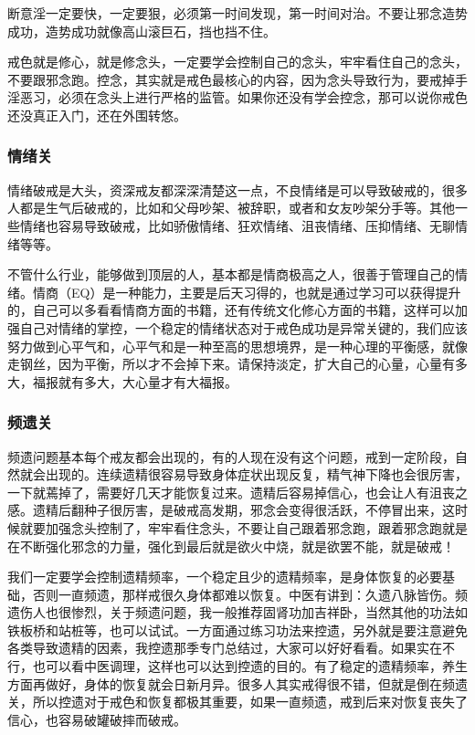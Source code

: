 断意淫一定要快，一定要狠，必须第一时间发现，第一时间对治。不要让邪念造势成功，造势成功就像高山滚巨石，挡也挡不住。

戒色就是修心，就是修念头，一定要学会控制自己的念头，牢牢看住自己的念头，不要跟邪念跑。控念，其实就是戒色最核心的内容，因为念头导致行为，要戒掉手淫恶习，必须在念头上进行严格的监管。如果你还没有学会控念，那可以说你戒色还没真正入门，还在外围转悠。

\subsubsection{情绪关}

情绪破戒是大头，资深戒友都深深清楚这一点，不良情绪是可以导致破戒的，很多人都是生气后破戒的，比如和父母吵架、被辞职，或者和女友吵架分手等。其他一些情绪也容易导致破戒，比如骄傲情绪、狂欢情绪、沮丧情绪、压抑情绪、无聊情绪等等。

不管什么行业，能够做到顶层的人，基本都是情商极高之人，很善于管理自己的情绪。情商（EQ）是一种能力，主要是后天习得的，也就是通过学习可以获得提升的，自己可以多看看情商方面的书籍，还有传统文化修心方面的书籍，这样可以加强自己对情绪的掌控，一个稳定的情绪状态对于戒色成功是异常关键的，我们应该努力做到心平气和，心平气和是一种至高的思想境界，是一种心理的平衡感，就像走钢丝，因为平衡，所以才不会掉下来。请保持淡定，扩大自己的心量，心量有多大，福报就有多大，大心量才有大福报。

\subsubsection{频遗关}

频遗问题基本每个戒友都会出现的，有的人现在没有这个问题，戒到一定阶段，自然就会出现的。连续遗精很容易导致身体症状出现反复，精气神下降也会很厉害，一下就蔫掉了，需要好几天才能恢复过来。遗精后容易掉信心，也会让人有沮丧之感。遗精后翻种子很厉害，是破戒高发期，邪念会变得很活跃，不停冒出来，这时候就要加强念头控制了，牢牢看住念头，不要让自己跟着邪念跑，跟着邪念跑就是在不断强化邪念的力量，强化到最后就是欲火中烧，就是欲罢不能，就是破戒！

我们一定要学会控制遗精频率，一个稳定且少的遗精频率，是身体恢复的必要基础，否则一直频遗，那样戒很久身体都难以恢复。中医有讲到：久遗八脉皆伤。频遗伤人也很惨烈，关于频遗问题，我一般推荐固肾功加吉祥卧，当然其他的功法如铁板桥和站桩等，也可以试试。一方面通过练习功法来控遗，另外就是要注意避免各类导致遗精的因素，我控遗那季专门总结过，大家可以好好看看。如果实在不行，也可以看中医调理，这样也可以达到控遗的目的。有了稳定的遗精频率，养生方面再做好，身体的恢复就会日新月异。很多人其实戒得很不错，但就是倒在频遗关，所以控遗对于戒色和恢复都极其重要，如果一直频遗，戒到后来对恢复丧失了信心，也容易破罐破摔而破戒。


